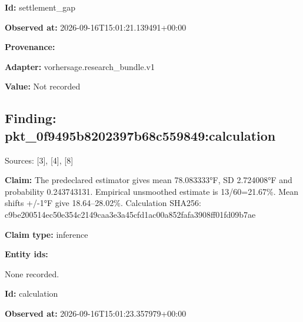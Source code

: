 \documentclass[11pt]{article}
\begin{document}
\par\noindent\textbf{Id:} settlement\_gap

\par\noindent\textbf{Observed at:} 2026-09-16T1\hspace{0pt}5:01:21.1394\hspace{0pt}91+00:00

\par\noindent\textbf{Provenance:} \par \par\noindent\textbf{Adapter:} vorhersage.r\hspace{0pt}esearch\_bund\hspace{0pt}le.v1

\par\noindent\textbf{Value:} Not recorded

\subsection*{\textcolor{epdarkgreen}{Finding: pkt\_0f9495b8\hspace{0pt}202397b68c55\hspace{0pt}9849:calcula\hspace{0pt}tion}}
Sources: [3], [4], [8]


\par\noindent\textbf{Claim:} The predeclared estimator gives mean 78.083333°F, SD 2.724008°F and probability 0.243743131. Empirical unsmoothed estimate is 13/60=21.67\%. Mean shifts +/-1°F give 18.64–28.02\%. Calculation SHA256: c9be200514ec\hspace{0pt}50e354c2149c\hspace{0pt}aa3e3a45cfd1\hspace{0pt}ac00a852fafa\hspace{0pt}3908ff01fd09\hspace{0pt}b7ae

\par\noindent\textbf{Claim type:} inference

\par\noindent\textbf{Entity ids:} \par None recorded.

\par\noindent\textbf{Id:} calculation

\par\noindent\textbf{Observed at:} 2026-09-16T1\hspace{0pt}5:01:23.3579\hspace{0pt}79+00:00
\end{document}
